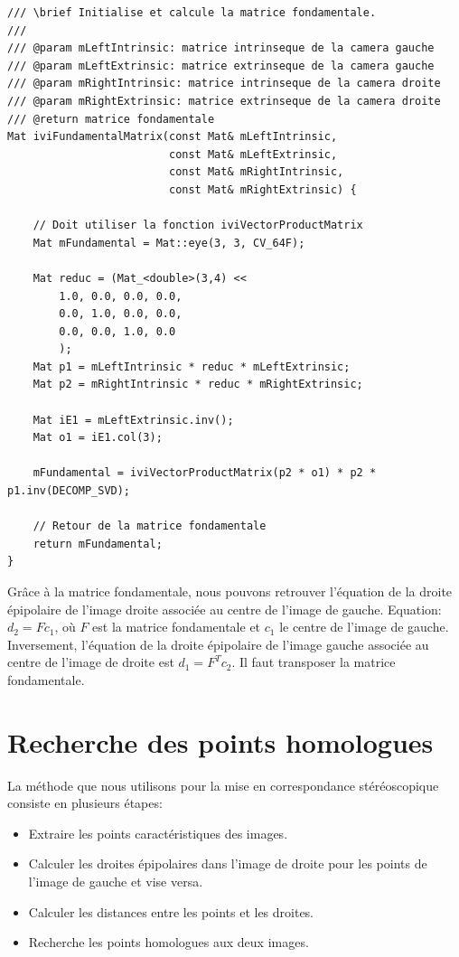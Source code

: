 \documentclass[a4paper,11pt]{article}
\begin{document}
\begin{lstlisting}[caption=Fonction qui calcule la matrice fondamentale]
/// \brief Initialise et calcule la matrice fondamentale.
///
/// @param mLeftIntrinsic: matrice intrinseque de la camera gauche
/// @param mLeftExtrinsic: matrice extrinseque de la camera gauche
/// @param mRightIntrinsic: matrice intrinseque de la camera droite
/// @param mRightExtrinsic: matrice extrinseque de la camera droite
/// @return matrice fondamentale
Mat iviFundamentalMatrix(const Mat& mLeftIntrinsic,
                         const Mat& mLeftExtrinsic,
                         const Mat& mRightIntrinsic,
                         const Mat& mRightExtrinsic) {

    // Doit utiliser la fonction iviVectorProductMatrix
    Mat mFundamental = Mat::eye(3, 3, CV_64F);

    Mat reduc = (Mat_<double>(3,4) <<
        1.0, 0.0, 0.0, 0.0,
        0.0, 1.0, 0.0, 0.0,
        0.0, 0.0, 1.0, 0.0
        );
    Mat p1 = mLeftIntrinsic * reduc * mLeftExtrinsic;
    Mat p2 = mRightIntrinsic * reduc * mRightExtrinsic;

    Mat iE1 = mLeftExtrinsic.inv();
    Mat o1 = iE1.col(3);

    mFundamental = iviVectorProductMatrix(p2 * o1) * p2 * p1.inv(DECOMP_SVD);

    // Retour de la matrice fondamentale
    return mFundamental;
}
\end{lstlisting}

Grâce à la matrice fondamentale, nous pouvons retrouver l'équation de la droite épipolaire 
de l'image droite associée au centre de l'image de gauche. Equation: $d_2=Fc_1$, où $F$ est 
la matrice fondamentale et $c_1$ le centre de l'image de gauche.\\

Inversement, l'équation de la droite épipolaire de l'image gauche associée au centre de l'image 
de droite est $d_1=F^Tc_2$. Il faut transposer la matrice fondamentale.\\

\newpage

\section{Recherche des points homologues}

La méthode que nous utilisons pour la mise en correspondance stéréoscopique consiste en plusieurs
étapes:

\begin{itemize}
 \item Extraire les points caractéristiques des images.
 \item Calculer les droites épipolaires dans l'image de droite pour les points de l'image de 
 gauche et vise versa.
 \item Calculer les distances entre les points et les droites.
 \item Recherche les points homologues aux deux images.\\
\end{itemize}
\end{document}
